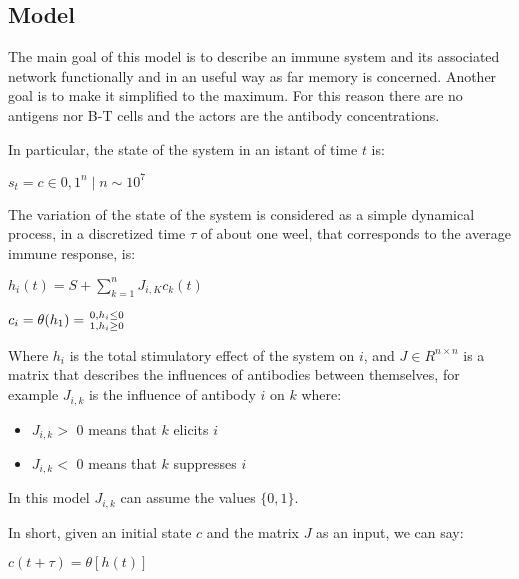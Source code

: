 \subsection{Model}

The main goal of this model is to describe an immune system and its associated network functionally and in an useful way as far memory is concerned. Another goal is to make it simplified to the maximum. For this reason there are no antigens nor B-T cells and the actors are the antibody concentrations.

In particular, the state of the system in an istant of time $t$ is: 
\begin{center}
    $s_t= c \in {0,1}^n \mid n \sim  10^7$
\end{center}

The variation of the state of the system is considered as a simple dynamical process, in a discretized time $\tau$ of about one weel, that corresponds to the average immune response, is:
\begin{center}
    $h_i(t) = S + \sum_{k = 1}^{n} J_{i,K} c_k(t)$

    $c_i = \theta(h_1) = {{0, h_i \leq 0} \above 0pt {1, h_i \geq 0}}$
\end{center}

Where $h_i$ is the total stimulatory effect of the system on $i$, and $J \in R^{n \times n}$ is a matrix that describes the influences of antibodies between themselves, for example $J_{i,k}$ is the influence of antibody $i$ on $k$ where:
\begin{itemize}
    \item $J_{i,k} >$  0 means that $k$ elicits $i$
    \item $J_{i,k} <$ 0 means that $k$ suppresses $i$
\end{itemize}

In this model $J_{i,k}$ can assume the values $\{0,1\}$.

In short, given an initial state $c$ and the matrix $J$ as an input, we can say:
\begin{center}
    $c(t + \tau) = \theta[h(t)]$
\end{center}

\pagebreak